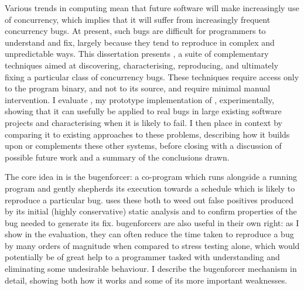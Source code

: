 \cleardoublepage
\newpage
\mbox{}
\newpage

\vspace*{\fill}
\centerline{{\bfseries \abstractname}}

\noindent
Various trends in computing mean that future software will make
increasingly use of concurrency, which implies that it will suffer
from increasingly frequent concurrency bugs.  At present, such bugs
are difficult for programmers to understand and fix, largely because
they tend to reproduce in complex and unpredictable ways.  This
dissertation presents {\technique}, a suite of complementary
techniques aimed at discovering, characterising, reproducing, and
ultimately fixing a particular class of concurrency bugs.  These
techniques require access only to the program binary, and not to its
source, and require minimal manual intervention.  I evaluate
{\implementation}, my prototype implementation of {\technique},
experimentally, showing that it can usefully be applied to real bugs
in large existing software projects and characterising when it is
likely to fail.  I then place {\technique} in context by comparing it
to existing approaches to these problems, describing how it builds
upon or complements these other systems, before closing with a
discussion of possible future work and a summary of the conclusions
drawn.

The core idea in {\technique} is the \gls{bugenforcer}: a co-program
which runs alongside a running program and gently shepherds its
execution towards a schedule which is likely to reproduce a particular
bug.  {\Technique} uses these both to weed out false positives
produced by its initial (highly conservative) static analysis and to
confirm properties of the bug needed to generate its fix.
\Glspl{bugenforcer} are also useful in their own right: as I show in
the evaluation, they can often reduce the time taken to reproduce a
bug by many orders of magnitude when compared to stress testing alone,
which would potentially be of great help to a programmer tasked with
understanding and eliminating some undesirable behaviour.  I describe
the \gls{bugenforcer} mechanism in detail, showing both how it works
and some of its more important weaknesses.

\vspace*{\fill}

